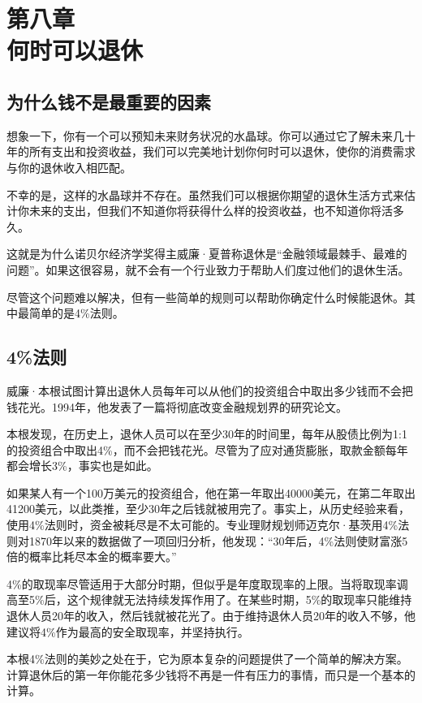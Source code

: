 \section[第八章\q 何时可以退休]{第八章\\ 何时可以退休}
\renewcommand{\bookchapter}{8}
\setcounter{figure}{0}
\setcounter{table}{0}
\subsection{为什么钱不是最重要的因素}
想象一下，你有一个可以预知未来财务状况的水晶球。你可以通过它了解未来几十年的所有支出和投资收益，我们可以完美地计划你何时可以退休，使你的消费需求与你的退休收入相匹配。

不幸的是，这样的水晶球并不存在。虽然我们可以根据你期望的退休生活方式来估计你未来的支出，但我们不知道你将获得什么样的投资收益，也不知道你将活多久。

这就是为什么诺贝尔经济学奖得主威廉·夏普称退休是“金融领域最棘手、最难的问题”。如果这很容易，就不会有一个行业致力于帮助人们度过他们的退休生活。

尽管这个问题难以解决，但有一些简单的规则可以帮助你确定什么时候能退休。其中最简单的是4\%法则。

\subsection{4\%法则}
威廉·本根试图计算出退休人员每年可以从他们的投资组合中取出多少钱而不会把钱花光。1994年，他发表了一篇将彻底改变金融规划界的研究论文。

本根发现，在历史上，退休人员可以在至少30年的时间里，每年从股债比例为1:1的投资组合中取出4\%，而不会把钱花光。尽管为了应对通货膨胀，取款金额每年都会增长3\%，事实也是如此。

如果某人有一个100万美元的投资组合，他在第一年取出40000美元，在第二年取出41200美元，以此类推，至少30年之后钱就被用完了。事实上，从历史经验来看，使用4\%法则时，资金被耗尽是不太可能的。专业理财规划师迈克尔·基茨用4\%法则对1870年以来的数据做了一项回归分析，他发现：“30年后，4\%法则使财富涨5倍的概率比耗尽本金的概率要大。”

4\%的取现率尽管适用于大部分时期，但似乎是年度取现率的上限。当将取现率调高至5\%后，这个规律就无法持续发挥作用了。在某些时期，5\%的取现率只能维持退休人员20年的收入，然后钱就被花光了。由于维持退休人员20年的收入不够，他建议将4\%作为最高的安全取现率，并坚持执行。

本根4\%法则的美妙之处在于，它为原本复杂的问题提供了一个简单的解决方案。计算退休后的第一年你能花多少钱将不再是一件有压力的事情，而只是一个基本的计算。


